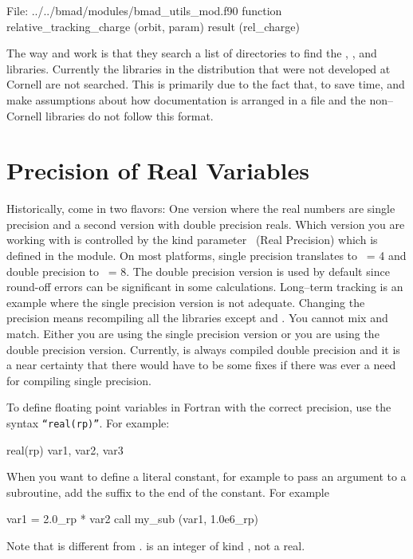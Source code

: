 {{{{{{\begin{example}
  File: ../../bmad/modules/bmad_utils_mod.f90
      function relative_tracking_charge (orbit, param) result (rel_charge)
\end{example}

The way  and  work is that they search a list of
directories to find the , , and 
libraries. Currently the libraries in the \bmad distribution that were
not developed at Cornell are not searched. This is primarily due to
the fact that, to save time,  and  make assumptions
about how documentation is arranged in a file and the non--Cornell libraries 
do not follow this format.

\section{Precision of Real Variables}
\label{s:precision}


Historically, \bmad come in two flavors: One version where the real
numbers are single precision and a second version with double
precision reals. Which version you are working with is controlled by
the kind parameter \ (Real Precision) which is defined in the
 module. On most platforms, single precision
translates to \ = 4 and double precision to \ = 8. The
double precision version is used by default since round-off errors can
be significant in some calculations. Long--term tracking is an example
where the single precision version is not adequate. Changing the
precision means recompiling all the libraries except  and
.  You cannot mix and match. Either you are using the
single precision version or you are using the double precision
version. Currently, \bmad is always compiled double precision and it
is a near certainty that there would have to be some fixes if there
was ever a need for compiling single precision.

To define floating point variables in Fortran with the correct precision,
 use the syntax {\tt ``real(rp)''}. For example:
\begin{example}
    real(rp) var1, var2, var3
\end{example}
When you want to define a literal constant, for example to pass an
argument to a subroutine, add the suffix  to the end of the
constant. For example
\begin{example}
   var1 =  2.0_rp * var2
   call my_sub (var1, 1.0e6_rp)
\end{example}
Note that  is different from .  is an
integer of kind , not a real.

}}}}}}
